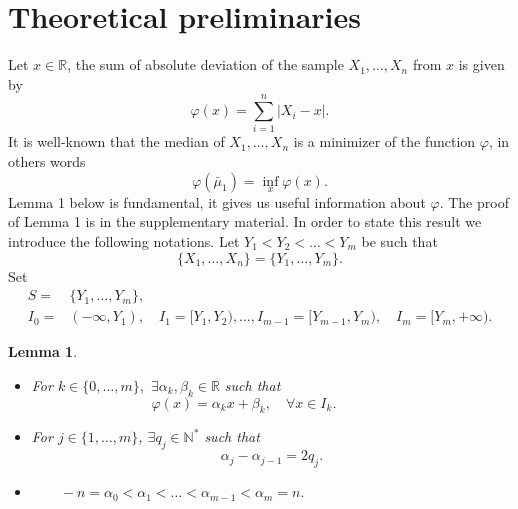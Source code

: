 \documentclass[
  11pt,
  a4paper,
]{article}
\newcommand\N{{\mathbb N}}
\newcommand\R{{\mathbb R}}
\newtheorem{lemma}{Lemma}
\begin{document}
\section{Theoretical preliminaries }\label{sec:2}
Let $x\in\R$, the sum of absolute deviation of the sample $X_1,\ldots,X_n$ from $x$ is given
by
\[
\varphi(x)=\sum_{i=1}^{n}\lvert X_i-x\rvert.
\]
It is well-known that the median of $X_1,\ldots,X_n$ is a minimizer of the  function $\varphi$, in
others words
\[
\varphi( \bar{\mu}_1) =\inf_{x} \varphi(x).
\]
Lemma 1 below is fundamental, it gives us useful information about $\varphi.$ The proof of Lemma 1 is in the supplementary material. In order to state this result
we introduce the following notations. Let $Y_1<Y_2<\ldots<Y_m$  be such that
\[
\{X_1,\ldots,X_n\}=\{Y_1,\ldots,Y_m\}.
\]
Set 
\begin{align*}
	S = &\{Y_1,\ldots,Y_m\}, \\
	I_0= & (-\infty,Y_1), \quad I_1=[Y_1,Y_2),\ldots, I_{m-1}=[Y_{m-1},Y_{m}),\quad I_m=[Y_m,+\infty).
\end{align*}
\begin{lemma} {\ }
	\begin{itemize}
		\item[(i)] For $k\in \{0,\ldots,m\},$  $\exists \alpha_k, \beta_k\in\R$ such that 
		\[
		\varphi(x)=\alpha_k x+ \beta_k, \quad \forall x\in I_k.\quad \quad\quad\quad
		\]	
		\item[(ii)]  For $j\in\{1,\ldots,m\}$, $\exists q_j\in\N^*$ such that
		\[
		\alpha_j- \alpha_{j-1}=2 q_j.
		\]      
		\item[(iii)] $\quad \quad-n=\alpha_0 <\alpha_1<\ldots <\alpha_{m-1}<\alpha_m=n.	$
	\end{itemize}	     
\end{lemma} 
\end{document}
